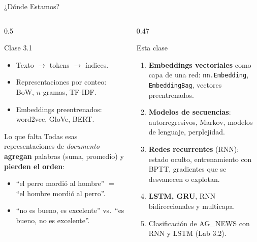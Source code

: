 \documentclass[aspectratio=169, 10pt]{beamer}
\begin{document}
\begin{frame}{¿D\'onde Estamos?}

	\begin{columns}[T]
		\begin{column}{0.5\textwidth}
			\begin{block}{Clase 3.1}
				\small
				\begin{itemize}
					\item Texto $\to$ tokens $\to$ \'indices.
					\item Representaciones por conteo: BoW, $n$-gramas, TF-IDF.
					\item Embeddings preentrenados: word2vec, GloVe, BERT.
				\end{itemize}
			\end{block}

			\begin{alertblock}{Lo que falta}
				\small
				Todas esas representaciones de \emph{documento} \textbf{agregan} palabras (suma, promedio) y \textbf{pierden el orden}:
				\begin{itemize}
					\item ``el perro mordi\'o al hombre'' $=$ ``el hombre mordi\'o al perro''.
					\item ``no es bueno, es excelente'' vs.\ ``es bueno, no es excelente''.
				\end{itemize}
			\end{alertblock}
		\end{column}

		\begin{column}{0.47\textwidth}
			\begin{block}{Esta clase}
				\small
				\begin{enumerate}
					\item \textbf{Embeddings vectoriales} como capa de una red: \texttt{nn.Embedding}, \texttt{EmbeddingBag}, vectores preentrenados.
					\item \textbf{Modelos de secuencias}: autorregresivos, Markov, modelos de lenguaje, perplejidad.
					\item \textbf{Redes recurrentes} (RNN): estado oculto, entrenamiento con BPTT, gradientes que se desvanecen o explotan.
					\item \textbf{LSTM, GRU}, RNN bidireccionales y multicapa.
					\item Clasificaci\'on de AG\_NEWS con RNN y LSTM (Lab 3.2).
				\end{enumerate}
			\end{block}
		\end{column}
	\end{columns}

\end{frame}
\end{document}
